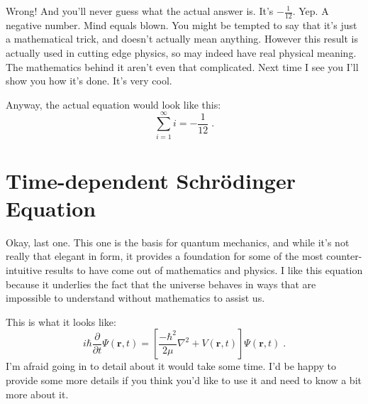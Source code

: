 \documentclass[12pt]{scrartcl}
\begin{document}
Wrong! And you'll never guess what the actual answer is. It's $-\frac{1}{12}$.
Yep. A negative number. Mind equals blown. You might be tempted to say that
it's just a mathematical trick, and doesn't actually mean anything. However this
result is actually used in cutting edge physics, so may indeed have real
physical meaning. The mathematics behind it aren't even
that complicated. Next time I see you I'll show you how it's done. It's very
cool.

Anyway, the actual equation would look like this:
\[ \sum_{i=1}^{\infty}i = -\frac{1}{12} \; . \]

\section{Time-dependent Schr\"{o}dinger Equation}

Okay, last one. This one is the basis for quantum mechanics, and while it's
not really that elegant in form, it provides a foundation for some of the
most counter-intuitive results to have come out of mathematics and physics.
I like this equation because it underlies the fact that the universe behaves
in ways that are impossible to understand without mathematics to assist us.

This is what it looks like:
\[ i\hbar\frac{\partial}{\partial t}\Psi(\mathbf{r},t) = \left[\frac{-\hbar^2}{2\mu}\nabla^2 + 
   V(\mathbf{r},t)\right]\Psi(\mathbf{r},t) \; . \]
I'm afraid going in to detail about it would take some time. I'd be happy
to provide some more details if you think you'd like to use it and need to know
a bit more about it.
\end{document}
